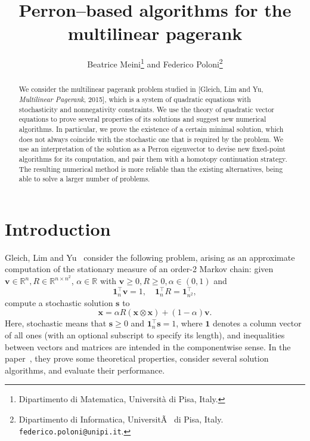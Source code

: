 \documentclass[10pt]{paper}
\begin{document}
\title{Perron--based algorithms for the multilinear pagerank}

\author{Beatrice Meini\footnote{Dipartimento di Matematica, Universit\`a di Pisa, Italy.} and Federico Poloni\footnote{Dipartimento di Informatica, UniversitÃ  di Pisa, Italy. \texttt{federico.poloni@unipi.it}.}}
\maketitle

\begin{abstract}
We consider the multilinear pagerank problem studied in [Gleich, Lim and Yu, \emph{Multilinear Pagerank}, 2015], which is a system of quadratic equations with stochasticity and nonnegativity constraints. We use the theory of quadratic vector equations to prove several properties of its solutions and suggest new numerical algorithms. In particular, we prove the existence of a certain minimal solution, which does not always coincide with the stochastic one that is required by the problem.
We use an interpretation of the solution as a Perron eigenvector to devise new fixed-point algorithms for its computation, and pair them with a homotopy continuation strategy. The resulting numerical method is more reliable than the existing alternatives, being able to solve a larger number of problems.
\end{abstract}


\maketitle

\section{Introduction}

Gleich, Lim and Yu~\cite{GleLY15} consider the following problem, arising as an approximate computation of the stationary measure of an order-2 Markov chain: given ${\mathbf{v}} \in \mathbb{R}^n, R \in \mathbb{R}^{n\times n^2}$, $\alpha\in \mathbb{R}$ with ${\mathbf{v}}\geq 0, R\geq 0, \alpha \in (0,1)$ and 
\begin{equation} \label{stochastic}
	{\mathbf{1}}_n^\top {\mathbf{v}} = 1, \quad {\mathbf{1}}_n^\top R = {\mathbf{1}}_{n^2}^\top,
\end{equation}
compute a stochastic solution ${\mathbf{s}}$ to
\begin{equation}  \label{mlpr}
	{\mathbf{x}} = \alpha R({\mathbf{x}} \otimes {\mathbf{x}}) + (1-\alpha) {\mathbf{v}}.
\end{equation}
Here, stochastic means that ${\mathbf{s}}\ge 0$  and ${\mathbf{1}}_n^\top {\mathbf{s}} = 1$, where ${\mathbf{1}}$ denotes a column vector of all ones (with an optional subscript to specify its length), and inequalities between vectors and matrices are intended in the componentwise sense.
In the paper~\cite{GleLY15}, they prove some theoretical properties, consider several solution algorithms, and evaluate their performance.
\end{document}
